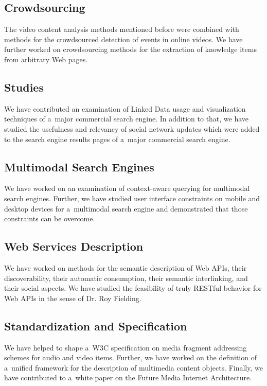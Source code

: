 \subsection{Crowdsourcing}

The video content analysis methods mentioned before
were combined with methods for the crowdsourced detection
of events in online videos.
We have further worked on crowdsourcing methods
for the extraction of knowledge items from arbitrary Web pages.

\subsection{Studies}

We have contributed an examination of Linked Data usage and
visualization techniques of a~major commercial search engine.
In addition to that, we have studied the usefulness and relevancy
of social network updates which were added to the search engine
results pages of a~major commercial search engine.

\subsection{Multimodal Search Engines}

We have worked on an examination of context-aware querying
for multimodal search engines.
Further, we have studied user interface constraints on
mobile and desktop devices for a~multimodal search engine
and demonstrated that those constraints can be overcome.

\subsection{Web Services Description}

We have worked on methods for the semantic description of Web APIs,
their discoverability, their automatic consumption,
their semantic interlinking, and their social aspects.
We have studied the feasibility of truly RESTful behavior
for Web APIs in the sense of Dr. Roy Fielding.
        
\subsection{Standardization and Specification}        
We have helped to shape a~W3C specification on media
fragment addressing schemes for audio and video items.
Further, we have worked on the definition of a~unified framework
for the description of multimedia content objects.
Finally, we have contributed to a~white paper on the
Future Media Internet Architecture.

